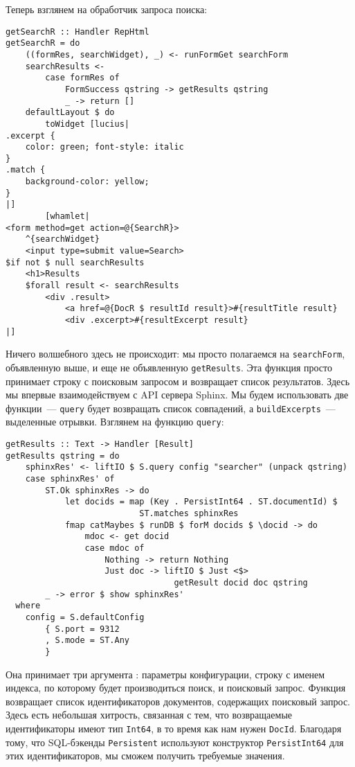 Теперь взглянем на обработчик запроса поиска: %

\begin{lstlisting}
getSearchR :: Handler RepHtml
getSearchR = do
    ((formRes, searchWidget), _) <- runFormGet searchForm
    searchResults <-
        case formRes of
            FormSuccess qstring -> getResults qstring
            _ -> return []
    defaultLayout $ do
        toWidget [lucius|
.excerpt {
    color: green; font-style: italic
}
.match {
    background-color: yellow;
}
|]
        [whamlet|
<form method=get action=@{SearchR}>
    ^{searchWidget}
    <input type=submit value=Search>
$if not $ null searchResults
    <h1>Results
    $forall result <- searchResults
        <div .result>
            <a href=@{DocR $ resultId result}>#{resultTitle result}
            <div .excerpt>#{resultExcerpt result}
|]
\end{lstlisting}%

Ничего волшебного здесь не происходит: мы просто полагаемся на \lstinline'searchForm', объявленную выше, и еще не объявленную \lstinline'getResults'. Эта функция просто принимает строку с поисковым запросом и возвращает список результатов. Здесь мы впервые взаимодействуем с API сервера Sphinx. Мы будем использовать две функции~--- \lstinline'query' будет возвращать список совпадений, а \lstinline'buildExcerpts'~--- выделенные отрывки. Взглянем на функцию \lstinline!query!:

\begin{lstlisting}
getResults :: Text -> Handler [Result]
getResults qstring = do
    sphinxRes' <- liftIO $ S.query config "searcher" (unpack qstring)
    case sphinxRes' of
        ST.Ok sphinxRes -> do
            let docids = map (Key . PersistInt64 . ST.documentId) $
                           ST.matches sphinxRes
            fmap catMaybes $ runDB $ forM docids $ \docid -> do
                mdoc <- get docid
                case mdoc of
                    Nothing -> return Nothing
                    Just doc -> liftIO $ Just <$>
                                  getResult docid doc qstring
        _ -> error $ show sphinxRes'
  where
    config = S.defaultConfig
        { S.port = 9312
        , S.mode = ST.Any
        }
\end{lstlisting}%

Она принимает три аргумента : параметры конфигурации, строку с именем индекса, по которому будет производиться поиск, и поисковый запрос. Функция возвращает список идентификаторов документов, содержащих поисковый запрос. Здесь есть небольшая хитрость, связанная с тем, что возвращаемые идентификаторы имеют тип \lstinline'Int64', в то время как нам нужен \lstinline'DocId'. Благодаря тому, что SQL-бэкенды \lstinline'Persistent' используют конструктор \lstinline'PersistInt64' для этих идентификаторов, мы сможем получить требуемые значения.

